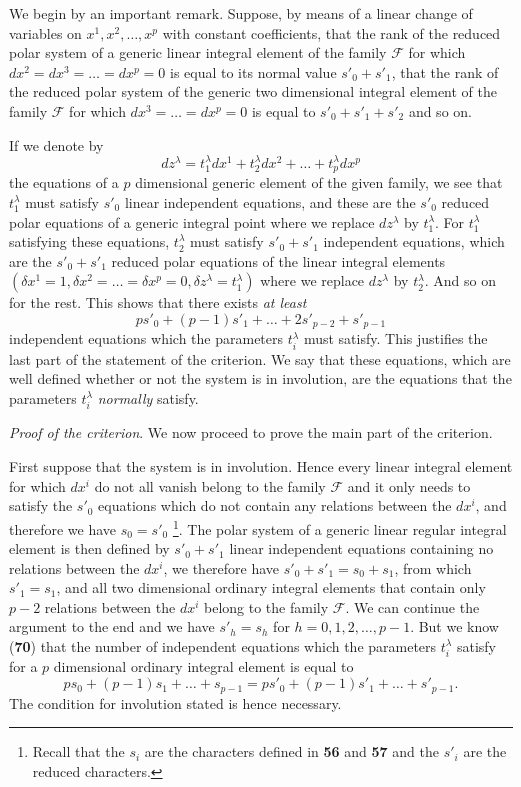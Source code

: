 \documentclass[leqno,11pt]{book}
\numberwithin{equation}{chapter}
\theoremstyle{shape1}
\theoremstyle{shape0}
\theoremstyle{shape2}
\theoremstyle{definition}
\begin{document}
\vspace{12pt}\fsec We begin by an important remark. Suppose, by means of a linear change of variables on $x^{1},x^{2},\dots,x^{p}$ with constant coefficients, that the rank of the reduced polar system of a generic linear integral element of the family $\mathcal{F}$ for which $dx^{2}=dx^{3}=\dots=dx^{p}=0$ is equal to its normal value $s'_{0}+s'_{1}$, that the rank of the reduced polar system of the generic two dimensional integral element of the family $\mathcal{F}$ for which $dx^{3}=\dots=dx^{p}=0$ is equal to $s'_{0}+s'_{1}+s'_{2}$ and so on.

If we denote by
\[
dz^{\lambda}=t_{1}^{\lambda}dx^{1}+t_{2}^{\lambda}dx^{2}+\dots+t_{p}^{\lambda}dx^{p}
\]
the equations of a $p$ dimensional generic element of the given family, we see that $t_{1}^{\lambda}$ must satisfy $s'_{0}$ linear independent equations, and these are the $s'_{0}$ reduced polar equations of a generic integral point where we replace $dz^{\lambda}$ by $t_{1}^{\lambda}$. For $t_{1}^{\lambda}$ satisfying these equations, $t_{2}^{\lambda}$ must satisfy $s'_{0}+s'_{1}$ independent equations, which are the $s'_{0}+s'_{1}$ reduced polar equations of the linear integral elements $(\delta x^{1}=1,\delta x^{2}=\dots=\delta x^{p}=0,\delta z^{\lambda}=t_{1}^{\lambda})$ where we replace $dz^{\lambda}$ by $t_{2}^{\lambda}$. And so on for the rest. This shows that there exists \emph{at least}
\[
ps'_{0}+(p-1)s'_{1}+\dots+2s'_{p-2}+s'_{p-1}
\]
independent equations which the parameters $t_{i}^{\lambda}$ must satisfy. This justifies the last part of the statement of the criterion. We say that these equations, which are well defined whether or not the system is in involution, are the equations that the parameters $t_{i}^{\lambda}$ \emph{normally} satisfy.


\vspace{12pt}\fsec \emph{Proof of the criterion}. We now proceed to prove the main part of the criterion.

First suppose that the system is in involution. Hence every linear integral element for which $dx^{i}$ do not all vanish belong to the family $\mathcal{F}$ and it only needs to satisfy the $s'_{0}$ equations which do not contain any relations between the $dx^{i}$, and therefore we have $s_{0}=s'_{0}$ \footnote{Recall that the $s_{i}$ are the characters defined in \textsection\textbf{56} and \textsection\textbf{57} and the $s'_{i}$ are the reduced characters.}. The polar system of a generic linear regular integral element is then defined by $s'_{0}+s'_{1}$ linear independent equations containing no relations between the $dx^{i}$, we therefore have $s'_{0}+s'_{1}=s_{0}+s_{1}$, from which $s'_{1}=s_{1}$, and all two dimensional ordinary integral elements that contain only $p-2$ relations between the $dx^{i}$ belong to the family $\mathcal{F}$. We can continue the argument to the end and we have $s'_{h}=s_{h}$ for $h=0,1,2,\dots,p-1$. But we know (\textsection\textbf{70}) that the number of independent equations which the parameters $t_{i}^{\lambda}$ satisfy for a $p$ dimensional ordinary integral element is equal to
\[
ps_{0}+(p-1)s_{1}+\dots+s_{p-1}=ps'_{0}+(p-1)s'_{1}+\dots+s'_{p-1}.
\]
The condition for involution stated is hence necessary.
\end{document}

